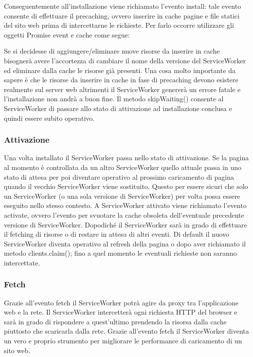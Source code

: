 \documentclass[11pt ,a4paper , twoside , openright ]{article}
\begin{document}
Conseguentemente all’installazione viene richiamato l’evento install: tale evento consente di effettuare il precaching, ovvero inserire in cache pagine e file statici del sito web prima di intercettarne le richieste. Per farlo occorre utilizzare gli oggetti Promise event e cache come segue:
\pagebreak

Se si decidesse di aggiungere/eliminare nuove risorse da inserire in cache bisognerà avere l’accortezza di cambiare il nome della versione del ServiceWorker ed eliminare dalla cache le risorse già presenti.
Una cosa molto importante da sapere è che le risorse da inserire in cache in fase di precaching devono esistere realmente sul server web altrimenti il ServiceWorker genererà un errore fatale e l’installazione non andrà a buon fine. 
Il metodo skipWaiting() consente al ServiceWorker di passare allo stato di attivazione ad installazione conclusa e quindi essere subito operativo.

\subsubsection{Attivazione}
Una volta installato il ServiceWorker passa nello stato di attivazione. Se la pagina al momento è controllata da un altro ServiceWorker quello attuale passa in uno stato di attesa per poi diventare operativo al prossimo caricamento di pagina quando il vecchio ServiceWorker viene sostituito.
Questo per essere sicuri che solo un ServiceWorker (o una sola versione di ServiceWorker) per volta possa essere eseguito nello stesso contesto.
A ServiceWorker attivato viene richiamato l’evento activate, ovvero l'evento per svuotare la cache obsoleta dell’eventuale precedente versione di ServiceWorker. Dopodiché il ServiceWorker sarà in grado di effettuare il fetching di risorse o di restare in attesa di altri eventi.
Di default il nuovo ServiceWorker diventa operativo al refresh della pagina o dopo aver richiamato il metodo clients.claim(); fino a quel momento le eventuali richieste non saranno intercettate. 

\subsubsection{Fetch}
Grazie all’evento fetch il ServiceWorker potrà agire da proxy tra l’applicazione web e la rete.
Il ServiceWorker intercetterà ogni richiesta HTTP del browser e sarà in grado di rispondere a quest’ultimo prendendo la risorsa dalla cache piuttosto che scaricarla dalla rete.
Grazie all’evento fetch il ServiceWorker diventa un vero e proprio strumento per migliorare le performance di caricamento di un sito web.
\end{document}
